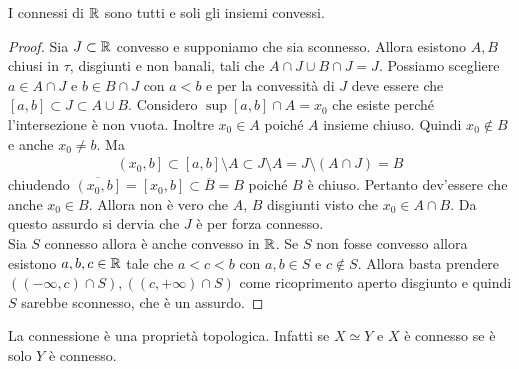 \begin{theorem}
	I connessi di $\mathbb{R}$ sono tutti e soli gli insiemi convessi. 
\end{theorem}
\begin{proof}
	Sia $J \subset \mathbb{R}$ convesso e supponiamo che sia sconnesso. Allora esistono $A, B$ chiusi in $\tau$, disgiunti e non banali, tali che $A \cap J \cup B \cap J = J$. Possiamo scegliere $a \in A \cap J$ e $b \in B \cap J$ con $a < b$ e per la convessità di $J$ deve essere che $\left[a,b\right] \subset J \subset A \cup B$. Considero $\sup \left[a,b\right] \cap A = x_0$ che esiste perché l'intersezione è non vuota. Inoltre $x_0 \in A$ poiché $A$ insieme chiuso. Quindi $x_0 \notin B$ e anche $x_0 \neq b$. Ma 
	\begin{equation}
	\begin{aligned}
	\left(x_0, b\right] \subset \left[a,b\right] \setminus A \subset J \setminus A =  J \setminus (A \cap J) = B
	\end{aligned}
	\end{equation}
	chiudendo $\overline{\left(x_0, b\right]} = \left[x_0, b\right] \subset \overline{B} = B$ poiché $B$ è chiuso. Pertanto dev'essere che anche $x_0 \in B$. Allora non è vero che $A$, $B$ disgiunti visto che $x_0 \in A \cap B$. Da questo assurdo si dervia che $J$ è per forza connesso.\\
	
	Sia $S$ connesso allora è anche convesso in $\mathbb{R}$. Se $S$ non fosse convesso allora esistono $a,b,c \in \mathbb{R}$ tale che $a < c < b$ con $a,b \in S$ e $c \notin S$. Allora basta prendere $((-\infty, c) \cap S), ((c, +\infty) \cap S)$ come ricoprimento aperto disgiunto e quindi $S$ sarebbe sconnesso, che è un assurdo.
\end{proof}

\begin{remark}
	La connessione è una proprietà topologica. Infatti se $X \simeq Y$ e $X$ è connesso se è solo $Y$ è connesso. 
\end{remark} 

